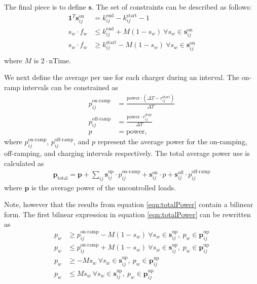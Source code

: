 The final piece is to define $\mathbf{s}$. The set of constraints can be described as follows: 
\begin{equation} \begin{aligned}
	\mathbf{1}^T\mathbf{s}^{\text{on}}_{ij} &= k^{\text{end}}_{ij} - k^{\text{start}}_{ij} - 1 \\
	s_w\cdot f_w &\le k^{\text{end}}_{ij} + M(1 - s_w) \ \forall s_w \in \mathbf{s}^{\text{on}}_{ij}\\
	s_w\cdot f_w &\ge k^{\text{start}}_{ij} - M(1 - s_w) \ \forall s_w \in \mathbf{s}^{\text{on}}_{ij}\\ 
\end{aligned} \end{equation}
where $M$ is $2\cdot\text{nTime}$.
\par We next define the average per use for each charger during an interval. The on-ramp intervals can be constrained as
\begin{align}
	p^{\text{on-ramp}}_{ij} &= \frac{\text{power}\cdot (\Delta T - r^{\text{start}}_{ij})}{\Delta T}\\
	p^{\text{off-ramp}}_{ij} &= \frac{\text{power}\cdot r^{\text{stop}}_{ij}}{\Delta T}\\
	p &= \text{power},
\end{align}
where $p_{ij}^{\text{on-ramp}}$, $p_{ij}^{\text{off-ramp}}$, and $p$ represent the average power for the on-ramping, off-ramping, and charging intervals respectively. The total average power use is calculated as 
\begin{align}\label{eqn:totalPower}
	\mathbf{p}_{\text{total}} = \mathbf{p} + \sum_{ij} \mathbf{s}^{\text{up}}_{ij}\cdot p^{\text{on-ramp}}_{ij} + \mathbf{s}^{\text{on}}_{ij}\cdot p + \mathbf{s}^{\text{off}}_{ij}\cdot p^{\text{off-ramp}}_{ij}
\end{align}
where $\mathbf{p}$ is the average power of the uncontrolled loads.
\par Note, however that the results from equation \ref{eqn:totalPower} contain a bilinear form. The first bilnear expression in  equation \ref{eqn:totalPower} can be rewritten as 
\begin{equation}
	\begin{aligned}
		p_w &\ge p^{\text{on-ramp}}_{ij} - M(1 - s_w) \ \forall s_w \in \mathbf{s}^{\text{up}}_{ij}, \ p_w \in \mathbf{p}_{ij}^{\text{up}}\\
		p_w &\le p^{\text{on-ramp}}_{ij} + M(1 - s_w) \ \forall s_w \in \mathbf{s}^{\text{up}}_{ij}, \ p_w \in \mathbf{p}_{ij}^{\text{up}}\\
		p_w &\ge -Ms_w \ \forall s_w \in \mathbf{s}^{\text{up}}_{ij}, \ p_w \in \mathbf{p}_{ij}^{\text{up}}\\
		p_w &\le Ms_w \ \forall s_w \in \mathbf{s}^{\text{up}}_{ij}, \ p_w \in \mathbf{p}_{ij}^{\text{up}}
	\end{aligned}
\end{equation}
